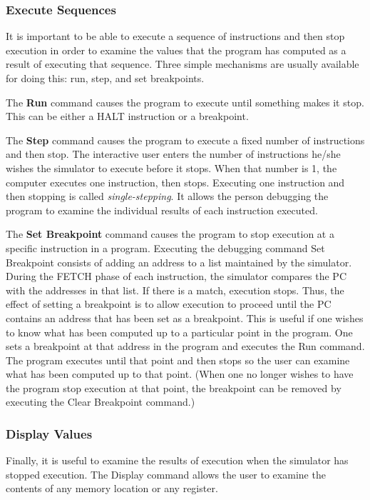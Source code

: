 \documentclass{patt}
\begin{document}
\subsubsection{Execute Sequences}
It is important to be able to execute a sequence of instructions and
then stop execution in order to examine the values that the program
has computed as a result of executing that sequence.  Three simple mechanisms 
are usually available for doing this: run, step, and set breakpoints.

The {\bf Run} command causes the program to execute until something
makes it stop.  This can be either a HALT instruction or a breakpoint.

The {\bf Step} command causes the program
to execute a fixed number of instructions and then stop.  The
interactive user enters the number of instructions he/she wishes
the simulator to execute before it stops.  When that number is
1, the computer executes one instruction, then stops.  Executing
one instruction and then stopping is called {\em single-stepping}.
It allows the person debugging the
program to examine the individual results of each instruction
executed.

The {\bf Set Breakpoint} command causes the program to stop execution
at a specific instruction in a program. Executing the debugging
command Set Breakpoint consists of adding an address to a list
maintained by the simulator.  During the FETCH phase of each instruction,
the simulator compares the PC with the addresses in that list.  If
there is a match, execution stops. Thus, the effect of setting a
breakpoint is to allow execution to proceed until the PC contains
an address that has been set as a breakpoint.  This is useful if one wishes to
know what has been computed up to a particular point in the program.
One sets a breakpoint at that address in the program and executes the
Run command.  The program executes until that point and then stops so
the user can examine what has been computed up to that point. (When
one no longer wishes to have the program stop execution at that
point, the breakpoint can be removed by executing the Clear Breakpoint
command.)

\subsubsection{Display Values}
Finally, it is useful to examine the results of execution when the
simulator has stopped execution.  The Display command allows the
user to examine the contents of any memory location or any register.
\end{document}
